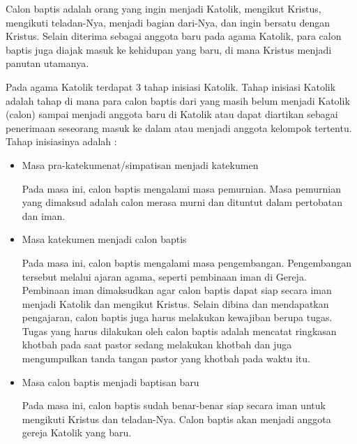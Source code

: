 	
	Calon baptis adalah orang yang ingin menjadi Katolik, mengikut Kristus, mengikuti teladan-Nya, menjadi bagian dari-Nya, dan ingin bersatu dengan Kristus. Selain diterima sebagai anggota baru pada agama Katolik, para calon baptis juga diajak masuk ke kehidupan yang baru, di mana Kristus menjadi panutan utamanya. 
		
	
	Pada agama Katolik terdapat 3 tahap inisiasi Katolik. Tahap inisiasi Katolik adalah tahap di mana para calon baptis dari yang masih belum menjadi Katolik (calon) sampai menjadi anggota baru di Katolik atau dapat diartikan sebagai penerimaan seseorang masuk ke dalam atau menjadi anggota kelompok tertentu. Tahap inisiasinya adalah \cite{cbaptis}:
	
	\begin{itemize}
		\item Masa pra-katekumenat/simpatisan menjadi katekumen
		
			Pada masa ini, calon baptis mengalami masa pemurnian. Masa pemurnian yang dimaksud adalah calon merasa murni dan dituntut dalam pertobatan dan iman.
		\item Masa katekumen menjadi calon baptis
		
		Pada masa ini, calon baptis mengalami masa pengembangan. Pengembangan tersebut melalui ajaran agama, seperti pembinaan iman di Gereja. Pembinaan iman dimaksudkan agar calon baptis dapat siap secara iman menjadi Katolik dan mengikut Kristus. Selain dibina dan mendapatkan pengajaran, calon baptis juga harus melakukan kewajiban berupa tugas. Tugas yang harus dilakukan oleh calon baptis adalah mencatat ringkasan khotbah pada saat pastor sedang melakukan khotbah dan juga mengumpulkan tanda tangan pastor yang khotbah pada waktu itu.
		\item Masa calon baptis menjadi baptisan baru
		
		Pada masa ini, calon baptis sudah benar-benar siap secara iman untuk mengikuti Kristus dan teladan-Nya. Calon baptis akan menjadi anggota gereja Katolik yang baru.
	\end{itemize}


	
